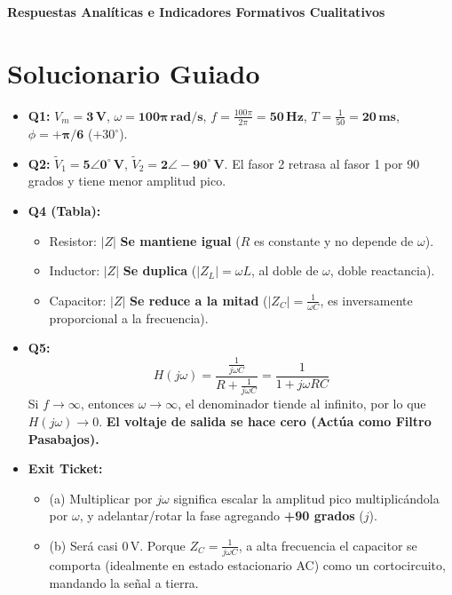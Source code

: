 \documentclass[11pt, a4paper]{article}
\begin{document}
\begin{tcolorbox}[colback=warnred!5!white, colframe=warnred, title=\textbf{Clave Docente Exclusiva: Worksheet EC4 (Fasores e Impedancias)}]
    \centering \textbf{Respuestas Analíticas e Indicadores Formativos Cualitativos}
\end{tcolorbox}

\section*{Solucionario Guiado}
\begin{itemize}\setlength\itemsep{0.2cm}
    \item \textbf{Q1:} $V_m = \mathbf{3\,\text{V}}$, $\omega = \mathbf{100\pi\,\text{rad/s}}$, $f = \frac{100\pi}{2\pi} = \mathbf{50\,\text{Hz}}$, $T = \frac{1}{50} = \mathbf{20\,\text{ms}}$, $\phi = \mathbf{+\pi/6}$ ($+30^\circ$).
    \item \textbf{Q2:} $\tilde{V}_1 = \mathbf{5\angle 0^\circ\,\text{V}}$, $\tilde{V}_2 = \mathbf{2\angle -90^\circ\,\text{V}}$. El fasor 2 retrasa al fasor 1 por 90 grados y tiene menor amplitud pico.
    \item \textbf{Q4 (Tabla):}
    \begin{itemize}
        \item Resistor: $|Z|$ \textbf{Se mantiene igual} ($R$ es constante y no depende de $\omega$).
        \item Inductor: $|Z|$ \textbf{Se duplica} ($|Z_L| = \omega L$, al doble de $\omega$, doble reactancia).
        \item Capacitor: $|Z|$ \textbf{Se reduce a la mitad} ($|Z_C| = \frac{1}{\omega C}$, es inversamente proporcional a la frecuencia).
    \end{itemize}
    \item \textbf{Q5:}
    $$ H(j\omega) = \frac{\frac{1}{j\omega C}}{R + \frac{1}{j\omega C}} = \frac{1}{1 + j\omega RC} $$
    Si $f \to \infty$, entonces $\omega \to \infty$, el denominador tiende al infinito, por lo que $H(j\omega) \to 0$. \textbf{El voltaje de salida se hace cero (Actúa como Filtro Pasabajos).}
    \item \textbf{Exit Ticket:} 
    \begin{itemize}
        \item (a) Multiplicar por $j\omega$ significa escalar la amplitud pico multiplicándola por $\omega$, y adelantar/rotar la fase agregando \textbf{+90 grados} ($j$).
        \item (b) Será casi $0\,\text{V}$. Porque $Z_C = \frac{1}{j\omega C}$, a alta frecuencia el capacitor se comporta (idealmente en estado estacionario AC) como un cortocircuito, mandando la señal a tierra.
    \end{itemize}
\end{itemize}
\end{document}

